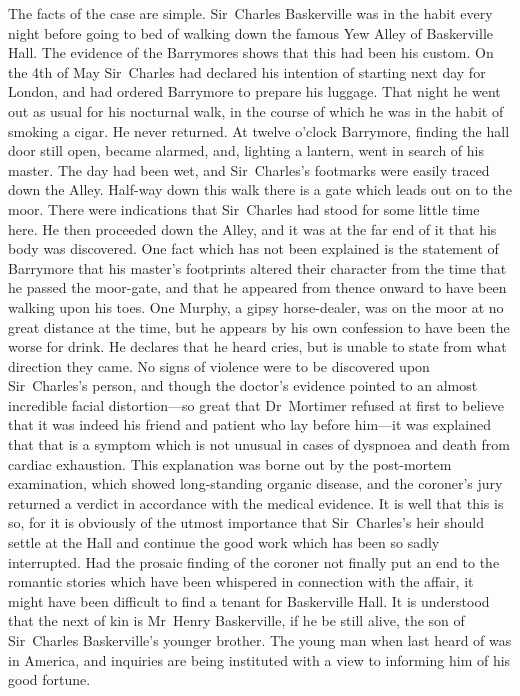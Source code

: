 \textsf{The facts of the case are simple. Sir~Charles Baskerville was in the habit every night before going to bed of walking down the famous Yew Alley of Baskerville Hall. The evidence of the Barrymores shows that this had been his custom. On the 4th of May Sir~Charles had declared his intention of starting next day for London, and had ordered Barrymore to prepare his luggage. That night he went out as usual for his nocturnal walk, in the course of which he was in the habit of smoking a cigar. He never returned. At twelve o'clock Barrymore, finding the hall door still open, became alarmed, and, lighting a lantern, went in search of his master. The day had been wet, and Sir~Charles's footmarks were easily traced down the Alley. Half-way down this walk there is a gate which leads out on to the moor. There were indications that Sir~Charles had stood for some little time here. He then proceeded down the Alley, and it was at the far end of it that his body was discovered. One fact which has not been explained is the statement of Barrymore that his master's footprints altered their character from the time that he passed the moor-gate, and that he appeared from thence onward to have been walking upon his toes. One Murphy, a gipsy horse-dealer, was on the moor at no great distance at the time, but he appears by his own confession to have been the worse for drink. He declares that he heard cries, but is unable to state from what direction they came. No signs of violence were to be discovered upon Sir~Charles's person, and though the doctor's evidence pointed to an almost incredible facial distortion—so great that Dr~Mortimer refused at first to believe that it was indeed his friend and patient who lay before him—it was explained that that is a symptom which is not unusual in cases of dyspnoea and death from cardiac exhaustion. This explanation was borne out by the post-mortem examination, which showed long-standing organic disease, and the coroner's jury returned a verdict in accordance with the medical evidence. It is well that this is so, for it is obviously of the utmost importance that Sir~Charles's heir should settle at the Hall and continue the good work which has been so sadly interrupted. Had the prosaic finding of the coroner not finally put an end to the romantic stories which have been whispered in connection with the affair, it might have been difficult to find a tenant for Baskerville Hall. It is understood that the next of kin is Mr~Henry Baskerville, if he be still alive, the son of Sir~Charles Baskerville's younger brother. The young man when last heard of was in America, and inquiries are being instituted with a view to informing him of his good fortune.}

